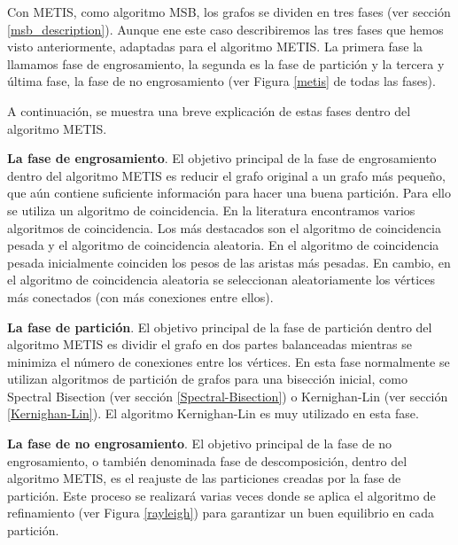 Con METIS, como algoritmo MSB, los grafos se dividen en tres fases (ver sección \ref{msb_description}). Aunque ene este caso describiremos las tres fases que hemos visto anteriormente, adaptadas para el algoritmo METIS. La primera fase la llamamos fase de engrosamiento, la segunda es la fase de partición y la tercera y última fase, la fase de no engrosamiento (ver Figura \ref{metis} de todas las fases).

A continuación, se muestra una breve explicación de estas fases dentro del algoritmo METIS.

\textbf{La fase de engrosamiento}. El objetivo principal de la fase de engrosamiento dentro del algoritmo METIS es reducir el grafo original a un grafo más pequeño, que aún contiene suficiente información para hacer una buena partición. Para ello se utiliza un algoritmo de coincidencia. En la literatura encontramos varios algoritmos de coincidencia. Los más destacados son el algoritmo de coincidencia pesada y el algoritmo de coincidencia aleatoria. En el algoritmo de coincidencia pesada inicialmente coinciden los pesos de las aristas más pesadas. En cambio, en el algoritmo de coincidencia aleatoria se seleccionan aleatoriamente los vértices más conectados (con más conexiones entre ellos). 

\textbf{La fase de partición}. El objetivo principal de la fase de partición dentro del algoritmo METIS es dividir el grafo en dos partes balanceadas mientras se minimiza el número de conexiones entre los vértices. En esta fase normalmente se utilizan algoritmos de partición de grafos para una bisección inicial, como Spectral Bisection (ver sección \ref{Spectral-Bisection}) o Kernighan-Lin (ver sección \ref{Kernighan-Lin}). El algoritmo Kernighan-Lin es muy utilizado en esta fase. 

\textbf{La fase de no engrosamiento}. El objetivo principal de la fase de no engrosamiento, o también denominada fase de descomposición, dentro del algoritmo METIS, es el reajuste de las particiones creadas por la fase de partición. Este proceso se realizará varias veces donde se aplica el algoritmo de refinamiento (ver Figura \ref{rayleigh}) para garantizar un buen equilibrio en cada partición.

